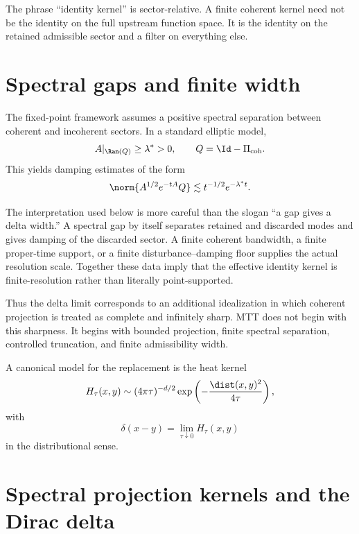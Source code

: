 \documentclass[11pt]{article}
\begin{document}
\begin{remark}
The phrase ``identity kernel'' is sector-relative.  A finite coherent kernel need not be
the identity on the full upstream function space.  It is the identity on the retained
admissible sector and a filter on everything else.
\end{remark}

\section{Spectral gaps and finite width}

The fixed-point framework assumes a positive spectral separation between coherent and
incoherent sectors.  In a standard elliptic model,
\begin{equation}
A|_{\Ran(Q)}\geq \lambda^\ast>0,\qquad Q=\Id-\Pi_{\mathrm{coh}}.
\end{equation}
This yields damping estimates of the form
\begin{equation}
\norm{A^{1/2}e^{-tA}Q}\lesssim t^{-1/2}e^{-\lambda^\ast t}.
\end{equation}

The interpretation used below is more careful than the slogan ``a gap gives a delta
width.''  A spectral gap by itself separates retained and discarded modes and gives
damping of the discarded sector.  A finite coherent bandwidth, a finite proper-time
support, or a finite disturbance--damping floor supplies the actual resolution scale.
Together these data imply that the effective identity kernel is finite-resolution rather
than literally point-supported.

Thus the delta limit corresponds to an additional idealization in which coherent
projection is treated as complete and infinitely sharp.  MTT does not begin with this
sharpness.  It begins with bounded projection, finite spectral separation, controlled
truncation, and finite admissibility width.

A canonical model for the replacement is the heat kernel
\begin{equation}
H_\tau(x,y)\sim (4\pi \tau)^{-d/2}\exp\left(-\frac{\dist(x,y)^2}{4\tau}\right),
\end{equation}
with
\begin{equation}
\delta(x-y)=\lim_{\tau\downarrow 0}H_\tau(x,y)
\end{equation}
in the distributional sense.

\section{Spectral projection kernels and the Dirac delta}
\end{document}
